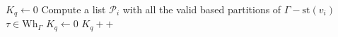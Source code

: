\documentclass[a4paper]{amsart}
\newcommand{\G}{\Gamma}
\newcommand{\Wh}{\mathrm{Wh}}
\newcommand{\st}{\mathrm{st}}
\theoremstyle{definition}
\theoremstyle{remark}
\begin{document}
\begin{algorithm}[H]
    
\caption{Algorithm to compute $K_q$, the number of essential vertex types of rank $q$}
\begin{algorithmic}[1]

    \State $K_q\gets 0$
    \EndFor
    \State Compute a list $\mathcal{P}_i$ with all the valid based partitions  of $\G-\st(v_i)$
    \EndFor
            \State $\tau \in \Wh_\G$
        \EndIf
    \EndFor
    \State $K_q\gets 0$
        \For {$\tau\in\Wh_\G$}
            \State $K_q++$
            \EndIf
        \EndIf
        \EndFor
    \EndFor
    
    
    
\end{algorithmic}


\end{algorithm}
\end{document}
